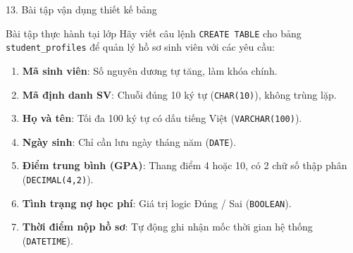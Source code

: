 \documentclass[aspectratio=169,11pt]{beamer}
\begin{document}
\begin{frame}{13. Bài tập vận dụng thiết kế bảng}
\begin{block}{Bài tập thực hành tại lớp}
  Hãy viết câu lệnh \texttt{CREATE TABLE} cho bảng \texttt{student\_profiles} để quản lý hồ sơ sinh viên với các yêu cầu:
  \begin{enumerate}\setlength{\itemsep}{2pt}
    \item \textbf{Mã sinh viên}: Số nguyên dương tự tăng, làm khóa chính.
    \item \textbf{Mã định danh SV}: Chuỗi đúng 10 ký tự (\texttt{CHAR(10)}), không trùng lặp.
    \item \textbf{Họ và tên}: Tối đa 100 ký tự có dấu tiếng Việt (\texttt{VARCHAR(100)}).
    \item \textbf{Ngày sinh}: Chỉ cần lưu ngày tháng năm (\texttt{DATE}).
    \item \textbf{Điểm trung bình (GPA)}: Thang điểm 4 hoặc 10, có 2 chữ số thập phân (\texttt{DECIMAL(4,2)}).
    \item \textbf{Tình trạng nợ học phí}: Giá trị logic Đúng / Sai (\texttt{BOOLEAN}).
    \item \textbf{Thời điểm nộp hồ sơ}: Tự động ghi nhận mốc thời gian hệ thống (\texttt{DATETIME}).
  \end{enumerate}
\end{block}
\end{frame}
\end{document}
